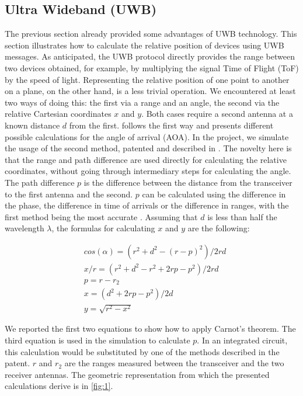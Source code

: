 \documentclass[letterpaper,twocolumn,10pt]{article}
\begin{document}
\subsection*{Ultra Wideband (UWB)}
The previous section already provided some advantages of UWB technology.
This section illustrates how to calculate the relative position of devices using UWB messages. As anticipated, the UWB protocol directly provides the range between two devices obtained, for example, by multiplying the signal Time of Flight (ToF) by the speed of light.
Representing the relative position of one point to another on a plane, on the other hand, is a less trivial operation. We encountered at least two ways of doing this: the first via a range and an angle, the second via the relative Cartesian coordinates $x$ and $y$. Both cases require a second antenna at a known distance $d$ from the first. 
\cite{8250079} follows the first way and presents different possible calculations for the angle of arrival (AOA). 
In the project, we simulate the usage of the second method, patented and described in \cite{patent}. The novelty here is that the range and path difference are used directly for calculating the relative coordinates, without going through intermediary steps for calculating the angle. The path difference $p$ is the difference between the distance from the transceiver to the first antenna and the second.  $p$ can be calculated using the difference in the phase, the difference in time of arrivals or the difference in ranges, with the first method being the most accurate  \cite{patent}.
Assuming that $d$ is less than half the wavelength $\lambda$, the formulas for calculating $x$ and $y$ are the following:

\noindent
\begin{align*}
& cos(\alpha)=(r^2 + d^2 - (r-p)^2)/2rd \\ 
& x/r = (r^2+d^2-r^2+2rp-p^2)/2rd \\
& p = r - r_2 \\
& x = (d^2+2rp-p^2)/2d \\
& y = \sqrt{r^2-x^2}
\end{align*}

We reported the first two equations to show how to apply Carnot's theorem. The third equation is used in the simulation to calculate $p$. In an integrated circuit, this calculation would be substituted by one of the methods described in the patent. $r$ and $r_2$ are the ranges measured between the transceiver and the two receiver antennas.
The geometric representation from which the presented calculations derive is in \autoref{fig:1}.
\end{document}
